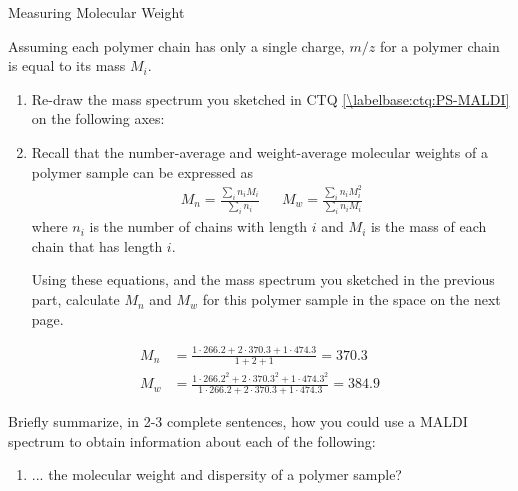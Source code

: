 \begin{activity}{Measuring Molecular Weight}
\begin{ctqs}
\begin{enumerate}
		\end{enumerate}
		
	\question Assuming each polymer chain has only a single charge, $m/z$ for a polymer chain is equal to its mass $M_i$.
	
		\begin{enumerate}
			\item Re-draw the mass spectrum you sketched in CTQ \ref{\labelbase:ctq:PS-MALDI} on the following axes:
		
			\begin{solution}[2in]
			\end{solution}
			
			\item Recall that the number-average and weight-average molecular weights of a polymer sample can be expressed as
		\begin{align*}
			M_n = \frac{\sum_i n_i M_i}{\sum_i n_i} && M_w = \frac{\sum_i n_i M_i^2}{\sum_i n_i M_i}
		\end{align*}
		where $n_i$ is the number of chains with length $i$ and $M_i$ is the mass of each chain that has length $i$.
		
				Using these equations, and the mass spectrum you sketched in the previous part, calculate $M_n$ and $M_w$ for this polymer sample in the space on the next page.
		\end{enumerate}
		
		\begin{solution}[3.5in]
			\begin{align*}
				M_n &= \frac{1\cdot 266.2 + 2\cdot 370.3 + 1\cdot 474.3}{1 + 2 + 1} = 370.3\\
				M_w &= \frac{1\cdot 266.2^2 + 2\cdot 370.3^2 + 1\cdot 474.3^2}{1\cdot 266.2 + 2\cdot 370.3 + 1\cdot 474.3} = 384.9
			\end{align*}
		\end{solution}
		
	\question Briefly summarize, in 2-3 complete sentences, how you could use a MALDI spectrum to obtain information about each of the following:
	
		\begin{enumerate}
			\item ... the molecular weight and dispersity of a polymer sample?
			

\end{enumerate}
\end{ctqs}
\end{activity}
